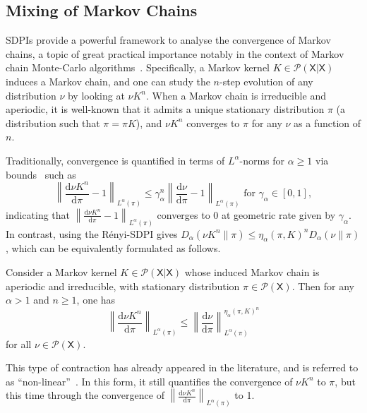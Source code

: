 \documentclass[conference,letterpaper]{IEEEtran}
\def \X{\mathsf X}
\def \calP{\mathcal P}
\newcommand{\renyiDiv}[2]{D_{\alpha}\left(#1\|#2\right)}
\newcommand{\dd}[1]{\mathrm{d}#1}
\begin{document}
\subsection{Mixing of Markov Chains}\label{section:mixing_time}\noindent
SDPIs provide a powerful framework to analyse the convergence of Markov chains, a topic of great practical importance notably in the context of Markov chain Monte-Carlo algorithms~\cite{levin2017markov,montenegro2006mathematical,gilks1995markov}. Specifically, a Markov kernel $K\in\calP(\X|\X)$ induces a Markov chain, and one can study the $n$-step evolution of any distribution $\nu$ by looking at $\nu K^n$. When a Markov chain is irreducible and aperiodic, it is well-known that it admits a unique stationary distribution $\pi$ (a distribution such that $\pi=\pi K$), and $\nu K^n$ converges to $\pi$ for any $\nu$ as a function of $n$.

Traditionally, convergence is quantified in terms of \mbox{$L^\alpha$-norms} for $\alpha\geq 1$ via bounds~\cite{rudolf2012explicit} such as
\begin{equation}\label{eq:mcmt_linear_sdpi}
    \left\|\frac{\dd\nu K^n}{\dd\pi} - 1\right\|_{L^\alpha(\pi)} \leq \gamma_\alpha^n\left\|\frac{\dd\nu}{\dd\pi} - 1\right\|_{L^\alpha(\pi)} \text{ for } \gamma_\alpha\in[0,1],
\end{equation}
indicating that $\left\|\frac{\dd\nu K^n}{\dd\pi} - 1\right\|_{L^\alpha(\pi)}$ converges to 0 at geometric rate given by $\gamma_\alpha$. In contrast, using the R\'enyi-SDPI gives ${\renyiDiv{\nu K^n}{\pi} \leq \eta_\alpha(\pi, K)^n \renyiDiv{\nu}{\pi}}$, which can be equivalently formulated as follows.
\begin{proposition}\label{prop:mcmt}
    Consider a Markov kernel $K\in\calP(\X|\X)$ whose induced Markov chain is aperiodic and irreducible, with stationary distribution $\pi\in\calP(\X)$. Then for any $\alpha>1$ and $n\geq 1$, one has
    \begin{equation}\label{eq:mcmt_non_linear_sdpi}
        \left\|\frac{\dd\nu K^n}{\dd\pi}\right\|_{L^\alpha(\pi)} \leq \left\|\frac{\dd\nu}{\dd\pi}\right\|_{L^\alpha(\pi)}^{\eta_\alpha(\pi, K)^n}
    \end{equation}
    for all $\nu\in\calP(\X)$.
\end{proposition}
This type of contraction has already appeared in the literature, and is referred to as ``non-linear''~\cite{polyanskiy2017strong,du2017strong,gu2023non}. In this form, it still quantifies the convergence of $\nu K^n$ to $\pi$, but this time through the convergence of $\left\|\frac{\dd\nu K^n}{\dd\pi}\right\|_{L^\alpha(\pi)}$ to 1.
\end{document}
